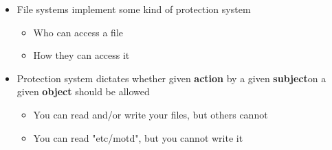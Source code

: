 \documentclass[12pt]{article}
\begin{document}
\begin{itemize}
    \begin{itemize}
        \item File systems implement some kind of protection system
        \begin{itemize}
            \item Who can access a file
            \item How they can access it
        \end{itemize}
        \item Protection system dictates whether given \color{green}\textbf{action}
        \color{black}\:by a given \color{orange}\textbf{subject}\color{black}\:on
        a given \color{red}\:\textbf{object}\color{black}\: should be allowed
        \begin{itemize}
            \item You can read and/or write your files, but others cannot
            \item You can read "etc/motd", but you cannot write it
        \end{itemize}
    \end{itemize}


\end{itemize}
\end{document}
